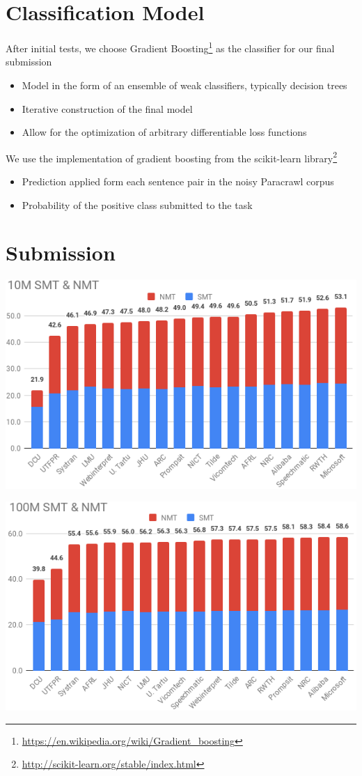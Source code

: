 \documentclass[a0]{sciposter}
\begin{document}
\begin{multicols*}{2}
\section*{\Large Classification Model}
After initial tests, we choose Gradient Boosting\footnote{\url{https://en.wikipedia.org/wiki/Gradient_boosting}} as the classifier for our final submission
\begin{itemize}
  \item Model in the form of an ensemble of weak classifiers, typically decision trees
  \item Iterative construction of the final model
  \item Allow for the optimization of arbitrary differentiable loss functions
\end{itemize}

We use the implementation of gradient boosting from the scikit-learn library\footnote{\url{http://scikit-learn.org/stable/index.html}}
\begin{itemize}
  \item Prediction applied form each sentence pair in the noisy Paracrawl corpus
  \item Probability of the positive class submitted to the task
\end{itemize}


\section*{\Large Submission}

\begin{center}
\includegraphics[width=0.85\columnwidth]{assets/10M_crop.png}

\includegraphics[width=0.85\columnwidth]{assets/100M_crop.png}
\end{center}


\end{multicols*}
\end{document}
